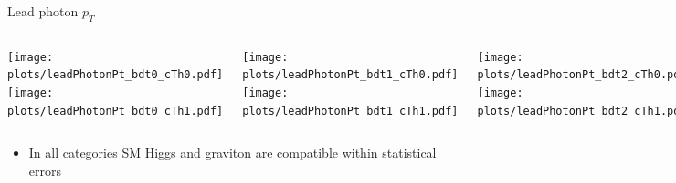 \documentclass[8pt]{beamer}
\begin{document}
\begin{frame}{Lead photon $p_T$}

  \begin{block}
   
     \begin{columns}
     
      \centering
     
      \column[t]{3.0cm}
      \texttt{[image: plots/leadPhotonPt\_bdt0\_cTh0.pdf]} \\
      \texttt{[image: plots/leadPhotonPt\_bdt0\_cTh1.pdf]} 
      
      \column[t]{3.0cm}
      \texttt{[image: plots/leadPhotonPt\_bdt1\_cTh0.pdf]} \\
      \texttt{[image: plots/leadPhotonPt\_bdt1\_cTh1.pdf]}
      
      \column[t]{3.0cm}
      \texttt{[image: plots/leadPhotonPt\_bdt2\_cTh0.pdf]} \\
      \texttt{[image: plots/leadPhotonPt\_bdt2\_cTh1.pdf]}
      
      \column[t]{3.0cm}
      \texttt{[image: plots/leadPhotonPt\_bdt3\_cTh0.pdf]} \\
      \texttt{[image: plots/leadPhotonPt\_bdt3\_cTh1.pdf]}
      
    \end{columns}
  
  \end{block}

  \begin{itemize}
    \item In all categories SM Higgs and graviton are compatible within statistical errors
  \end{itemize}

\end{frame}
\end{document}
